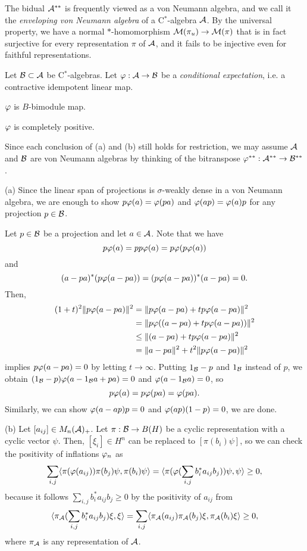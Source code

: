 \documentclass{../../small}
\begin{document}
\begin{rmk}
The bidual $\mathcal{A}^{**}$ is frequently viewed as a von Neumann algebra, and we call it the \emph{enveloping von Neumann algebra} of a C$^*$-algebra $\mathcal{A}$.
By the universal property, we have a normal $*$-homomorphism $\mathcal{M}(\pi_u)\to\mathcal{M}(\pi)$ that is in fact surjective for every representation $\pi$ of $\mathcal{A}$, and it fails to be injective even for faithful representations.
\end{rmk}

\begin{thm}[Tomiyama]
Let $\mathcal{B}\subset\mathcal{A}$ be C$^*$-algebras.
Let $\varphi:\mathcal{A}\to\mathcal{B}$ be a \emph{conditional expectation}, i.e. a contractive idempotent linear map.
\begin{parts}
\item $\varphi$ is $B$-bimodule map.
\item $\varphi$ is completely positive.
\end{parts}
\end{thm}
\begin{pf}
Since each conclusion of (a) and (b) still holds for restriction, we may assume $\mathcal{A}$ and $\mathcal{B}$ are von Neumann algebras by thinking of the bitranspose $\varphi^{**}:\mathcal{A}^{**}\to\mathcal{B}^{**}$.

(a)
Since the linear span of projections is $\sigma$-weakly dense in a von Neumann algebra, we are enough to show $p\varphi(a)=\varphi(pa)$ and $\varphi(ap)=\varphi(a)p$ for any projection $p\in\mathcal{B}$.

Let $p\in\mathcal{B}$ be a projection and let $a\in\mathcal{A}$.
Note that we have
\[p\varphi(a)=pp\varphi(a)=p\varphi(p\varphi(a))\]
and
\[(a-pa)^*(p\varphi(a-pa))=(p\varphi(a-pa))^*(a-pa)=0.\]
Then,
\begin{align*}
(1+t)^2\|p\varphi(a-pa)\|^2
&=\|p\varphi(a-pa)+tp\varphi(a-pa)\|^2\\
&=\|p\varphi((a-pa)+tp\varphi(a-pa))\|^2\\
&\le\|(a-pa)+tp\varphi(a-pa)\|^2\\
&=\|a-pa\|^2+t^2\|p\varphi(a-pa)\|^2
\end{align*}
implies $p\varphi(a-pa)=0$ by letting $t\to\infty$.
Putting $1_{\mathcal{B}}-p$ and $1_{\mathcal{B}}$ instead of $p$, we obtain $(1_{\mathcal{B}}-p)\varphi(a-1_{\mathcal{B}} a+pa)=0$ and $\varphi(a-1_{\mathcal{B}} a)=0$, so
\[p\varphi(a)=p\varphi(pa)=\varphi(pa).\]
Similarly, we can show $\varphi(a-ap)p=0$ and $\varphi(ap)(1-p)=0$, we are done.

(b)
Let $[a_{ij}]\in M_n(\mathcal{A})_+$.
Let $\pi:\mathcal{B}\to B(H)$ be a cyclic representation with a cyclic vector $\psi$.
Then, $[\xi_i]\in H^n$ can be replaced to $[\pi(b_i)\psi]$, so we can check the positivity of inflations $\varphi_n$ as
\[\sum_{i,j}\langle\pi(\varphi(a_{ij}))\pi(b_j)\psi,\pi(b_i)\psi\rangle=\langle\pi(\varphi(\sum_{i,j}b_i^*a_{ij}b_j))\psi,\psi\rangle\ge0,\]
because it follows $\sum_{i,j}b_i^*a_{ij}b_j\ge0$ by the positivity of $a_{ij}$ from
\[\langle\pi_{\mathcal{A}}(\sum_{i,j}b_i^*a_{ij}b_j)\xi,\xi\rangle=\sum_{i,j}\langle\pi_{\mathcal{A}}(a_{ij})\pi_{\mathcal{A}}(b_j)\xi,\pi_{\mathcal{A}}(b_i)\xi\rangle\ge0,\]
where $\pi_{\mathcal{A}}$ is any representation of $\mathcal{A}$.
\end{pf}
\end{document}
